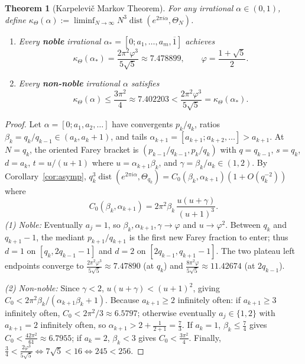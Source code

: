 \documentclass[11pt]{article}
\newtheorem{theorem}{Theorem}
\theoremstyle{definition}
\newcommand{\dist}{\operatorname{dist}}
\begin{document}
\begin{theorem}[Karpelevi\v{c} Markov Theorem]\label{thm:markov}
For any irrational $\alpha\in(0,1)$, define $\kappa_\Theta(\alpha):=\liminf_{N\to\infty} N^3\dist(e^{2\pi i\alpha},\Theta_N)$.
\begin{enumerate}
\item Every \textbf{noble} irrational $\alpha_*=[0;a_1,\dots,a_m,\overline{1}]$ achieves
\[
 \kappa_\Theta(\alpha_*) = \frac{2\pi^2\varphi^3}{5\sqrt{5}} \approx 7.478899,\qquad \varphi=\frac{1+\sqrt{5}}{2}.
\]
\item Every \textbf{non-noble} irrational $\alpha$ satisfies
\[
 \kappa_\Theta(\alpha) \le \frac{3\pi^2}{4} \approx 7.402203 < \frac{2\pi^2\varphi^3}{5\sqrt{5}} = \kappa_\Theta(\alpha_*).
\]
\end{enumerate}
\end{theorem}
\begin{proof}
Let $\alpha=[0;a_1,a_2,\dots]$ have convergents $p_k/q_k$, ratios $\beta_k=q_k/q_{k-1}\in(a_k,a_k+1)$, and tails $\alpha_{k+1}=[a_{k+1};a_{k+2},\dots]>a_{k+1}$. At $N=q_k$, the oriented Farey bracket is $(p_{k-1}/q_{k-1},p_k/q_k)$ with $q=q_{k-1}$, $s=q_k$, $d=a_k$, $t=u/(u+1)$ where $u=\alpha_{k+1}\beta_k$, and $\gamma=\beta_k/a_k\in(1,2)$. By Corollary~\ref{cor:asymp}, $q_k^3\dist(e^{2\pi i\alpha},\Theta_{q_k})=C_0(\beta_k,\alpha_{k+1})(1+O(q_k^{-2}))$ where
\[
 C_0(\beta_k,\alpha_{k+1}) = 2\pi^2\beta_k\,\frac{u(u+\gamma)}{(u+1)^3}.
\]
\emph{(1) Noble:} Eventually $a_j=1$, so $\beta_k,\alpha_{k+1},\gamma\to\varphi$ and $u\to\varphi^2$. Between $q_k$ and $q_{k+1}-1$, the mediant $p_{k+1}/q_{k+1}$ is the first new Farey fraction to enter; thus $d=1$ on $[q_k,2q_{k-1}-1]$ and $d=2$ on $[2q_{k-1},q_{k+1}-1]$. The two plateau left endpoints converge to $\frac{2\pi^2\varphi^3}{5\sqrt{5}}\approx 7.47890$ (at $q_k$) and $\frac{8\pi^2\varphi}{5\sqrt{5}}\approx 11.42674$ (at $2q_{k-1}$).

\emph{(2) Non-noble:} Since $\gamma<2$, $u(u+\gamma)<(u+1)^2$, giving $C_0<2\pi^2\beta_k/(\alpha_{k+1}\beta_k+1)$. Because $a_{k+1}\ge 2$ infinitely often: if $a_{k+1}\ge 3$ infinitely often, $C_0<2\pi^2/3\approx 6.5797$; otherwise eventually $a_j\in\{1,2\}$ with $a_{k+1}=2$ infinitely often, so $\alpha_{k+1}>2+\frac{1}{2+1}=\frac{7}{3}$. If $a_k=1$, $\beta_k\le \frac{7}{4}$ gives $C_0<\frac{42\pi^2}{61}\approx 6.7955$; if $a_k=2$, $\beta_k<3$ gives $C_0<\frac{3\pi^2}{4}$. Finally, $\frac{3}{4}<\frac{2\varphi^3}{5\sqrt{5}}\iff 7\sqrt{5}<16\iff 245<256$.
\end{proof}
\end{document}
